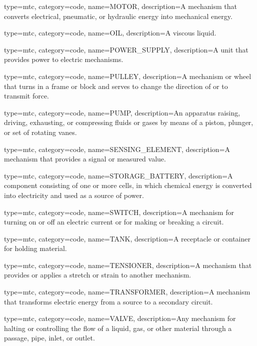 {
  type=mtc,
  category=code,
  name={MOTOR},
  description={A mechanism that converts electrical, pneumatic, or hydraulic energy into mechanical energy.}
}

{
  type=mtc,
  category=code,
  name={OIL},
  description={A viscous liquid.}
}

{
  type=mtc,
  category=code,
  name={POWER\_SUPPLY},
  description={A unit that provides power to electric mechanisms.}
}

{
  type=mtc,
  category=code,
  name={PULLEY},
  description={A mechanism or wheel that turns in a frame or block and serves to change the direction of or to transmit force.}
}

{
  type=mtc,
  category=code,
  name={PUMP},
  description={An apparatus raising, driving, exhausting, or compressing fluids or gases by means of a piston, plunger, or set of rotating vanes.}
}

{
  type=mtc,
  category=code,
  name={SENSING\_ELEMENT},
  description={A mechanism that provides a signal or measured value.}
}

{
  type=mtc,
  category=code,
  name={STORAGE\_BATTERY},
  description={A component consisting of one or more cells, in which chemical energy is converted into electricity and used as a source of power. }
}

{
  type=mtc,
  category=code,
  name={SWITCH},
  description={A mechanism for turning on or off an electric current or for making or breaking a circuit.}
}

{
  type=mtc,
  category=code,
  name={TANK},
  description={A receptacle or container for holding material.}
}

{
  type=mtc,
  category=code,
  name={TENSIONER},
  description={A mechanism that provides or applies a stretch or strain to another mechanism.}
}

{
  type=mtc,
  category=code,
  name={TRANSFORMER},
  description={A mechanism that transforms electric energy from a source to a secondary circuit.}
}

{
  type=mtc,
  category=code,
  name={VALVE},
  description={Any mechanism for halting or controlling the flow of a liquid, gas, or other material through a passage, pipe, inlet, or outlet.}
}

